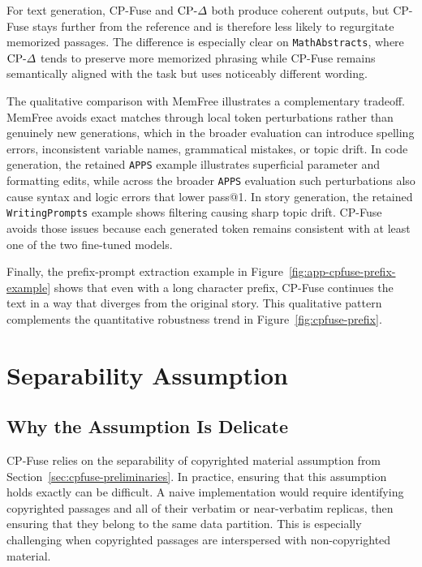 For text generation, CP-Fuse and \(\text{CP-}\Delta\) both produce coherent outputs, but CP-Fuse stays further from the reference and is therefore less likely to regurgitate memorized passages. The difference is especially clear on \texttt{MathAbstracts}, where \(\text{CP-}\Delta\) tends to preserve more memorized phrasing while CP-Fuse remains semantically aligned with the task but uses noticeably different wording.

The qualitative comparison with MemFree illustrates a complementary tradeoff. MemFree avoids exact matches through local token perturbations rather than genuinely new generations, which in the broader evaluation can introduce spelling errors, inconsistent variable names, grammatical mistakes, or topic drift. In code generation, the retained \texttt{APPS} example illustrates superficial parameter and formatting edits, while across the broader \texttt{APPS} evaluation such perturbations also cause syntax and logic errors that lower pass@1. In story generation, the retained \texttt{WritingPrompts} example shows filtering causing sharp topic drift. CP-Fuse avoids those issues because each generated token remains consistent with at least one of the two fine-tuned models.

Finally, the prefix-prompt extraction example in Figure~\ref{fig:app-cpfuse-prefix-example} shows that even with a long character prefix, CP-Fuse continues the text in a way that diverges from the original story. This qualitative pattern complements the quantitative robustness trend in Figure~\ref{fig:cpfuse-prefix}.



\FloatBarrier
\clearpage

\section{Separability Assumption}
\label{app:cpfuse-separability}

\subsection{Why the Assumption Is Delicate}

CP-Fuse relies on the separability of copyrighted material assumption from Section~\ref{sec:cpfuse-preliminaries}. In practice, ensuring that this assumption holds exactly can be difficult. A naive implementation would require identifying copyrighted passages and all of their verbatim or near-verbatim replicas, then ensuring that they belong to the same data partition. This is especially challenging when copyrighted passages are interspersed with non-copyrighted material.

